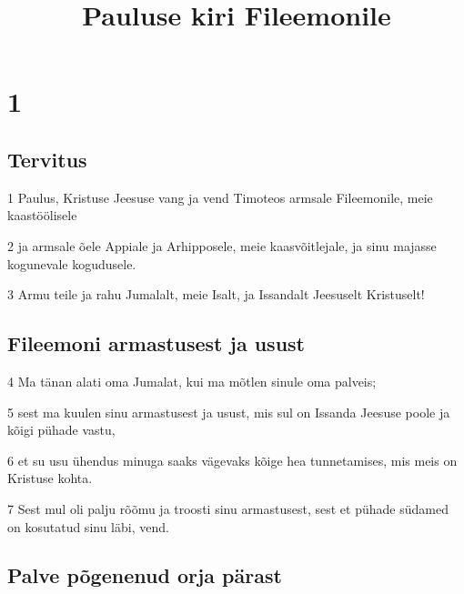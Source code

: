 

\title{Pauluse kiri Fileemonile}

\chapter{1}

\section*{Tervitus}

\par 1 Paulus, Kristuse Jeesuse vang ja vend Timoteos armsale Fileemonile, meie kaastöölisele
\par 2 ja armsale õele Appiale ja Arhipposele, meie kaasvõitlejale, ja sinu majasse kogunevale kogudusele.
\par 3 Armu teile ja rahu Jumalalt, meie Isalt, ja Issandalt Jeesuselt Kristuselt!
\section*{Fileemoni armastusest ja usust}

\par 4 Ma tänan alati oma Jumalat, kui ma mõtlen sinule oma palveis;
\par 5 sest ma kuulen sinu armastusest ja usust, mis sul on Issanda Jeesuse poole ja kõigi pühade vastu,
\par 6 et su usu ühendus minuga saaks vägevaks kõige hea tunnetamises, mis meis on Kristuse kohta.
\par 7 Sest mul oli palju rõõmu ja troosti sinu armastusest, sest et pühade südamed on kosutatud sinu läbi, vend.

\section*{Palve põgenenud orja pärast}

